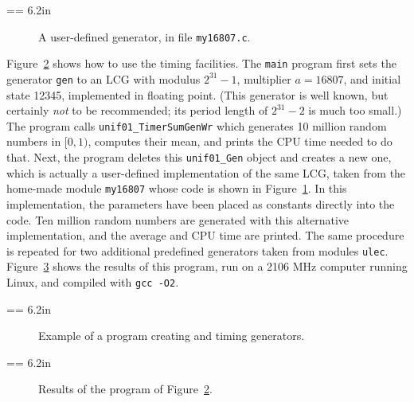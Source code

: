 =\vbox {\hsize = 6.2in
{\smallc
}
}

\begin{figure} \centering {}
\caption {A user-defined generator, in file {\tt my16807.c}.}
\label {fig:my16807}
\end{figure}



Figure~\ref{fig:unif-timing} shows how to use the timing facilities.
The {\tt main} program first sets the generator {\tt gen} to an LCG
with modulus $2^{31}-1$, multiplier $a = 16807$, and initial state 12345,
implemented in floating point. 
(This generator is well known, but certainly {\em not\/} to be recommended;
its period length of $2^{31}-2$ is much too small.)
The program calls {\tt unif01\_TimerSumGenWr} which generates 10 million 
random numbers in $[0, 1)$, computes their mean, and prints the CPU time 
needed to do that.
Next, the program deletes this {\tt unif01\_Gen} object and creates a 
new one, which is actually a user-defined implementation of the same LCG,
taken from the home-made module {\tt my16807} whose code is shown in
Figure~\ref{fig:my16807}.
In this implementation, the parameters have been placed as constants 
directly into the code.
Ten million random numbers are generated with this alternative 
implementation, and the average and CPU time are printed.
The same procedure is repeated for two additional predefined
generators taken from modules {\tt ulec}.
Figure~\ref{fig:unif-timing-res} shows the results of this program,
run on a 2106 MHz computer running Linux, and compiled with {\tt gcc -O2}.



=\vbox {\hsize = 6.2in
{\smallc
}
}

\begin{figure} \centering {}
\caption {Example of a program creating and timing generators.}
\label {fig:unif-timing}
\end{figure}


=\vbox {\hsize = 6.2in
{\smallc
}
}

\begin{figure} \centering {}
\caption {Results of the program of Figure~\ref{fig:unif-timing}.}
\label {fig:unif-timing-res}
\end{figure}


